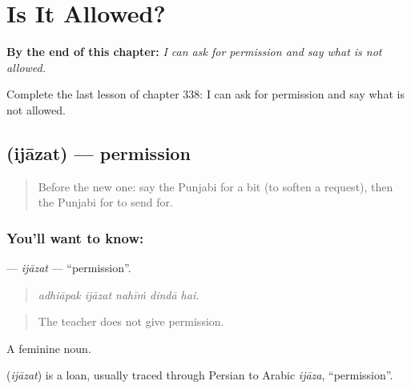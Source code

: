 
\chapter{Is It Allowed?}
\label{ch:pa-a2-is-it-allowed}

\begin{chapteropening}
\textbf{By the end of this chapter:} \emph{I can ask for permission and say what is not allowed.}

Complete the last lesson of chapter 338: I can ask for permission and say what is not allowed.
\end{chapteropening}

\section[\texorpdfstring{\pa{ਇਜਾਜ਼ਤ} (ijāzat)}{ਇਜਾਜ਼ਤ (ijāzat)}]{ (ijāzat) — permission}

\label{lesson:PA-C338-ijazat}



\begin{quote}
Before the new one: say the Punjabi for a bit (to soften a request), then the Punjabi for to send for.
\end{quote}

\subsection*{You'll want to know: }
\textbf{} — \emph{ijāzat} — \textquotedblleft{}permission\textquotedblright{}.

\begin{quote}
    
\end{quote}

\begin{quote}
\emph{adhiāpak ijāzat nahīṁ dindā hai.}
\end{quote}

\begin{quote}
The teacher does not give permission.
\end{quote}

A feminine noun.

\begin{cousinweb}
\textbf{} (\emph{ijāzat}) is a loan, usually traced through Persian to Arabic \emph{ijāza}, \textquotedblleft{}permission\textquotedblright{}.
\end{cousinweb}

